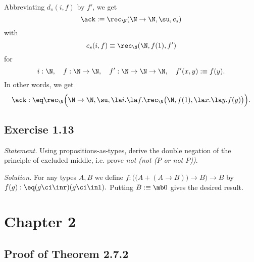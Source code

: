 \documentclass[12pt]{article}
\begin{document}
Abbreviating $d_s(i,f)$ by $f'$, we get 
$$
\ack:\equiv\rec_\N(\N\to\N,\su,c_s)
$$ 
with 
$$ 
c_s(i,f)\equiv\rec_\N(\N,f(1),f')
$$ 
for 
$$ 
i:\N,\quad f:\N\to\N,\quad f':\N\to\N\to\N,\quad f'(x,y):\equiv f(y).
$$ 
In other words, we get 
$$
\ack:\eq\rec_\N\Big(\N\to\N,\su,\la i.\la f.\rec_\N\big(\N,f(1),\la x.\la y.f(y)\big)\Big).
$$


\subsection{Exercise 1.13}

\emph{Statement.} Using propositions-as-types, derive the double negation of the principle of excluded middle, i.e. prove \emph{not (not ($P$ or not $P$))}.

\nn\emph{Solution.} For any types $A,B$ we define $f:\Big(\big(A+(A\to B)\big)\to B\Big)\to B$ by $f(g):\eq(g\ci\inr)(g\ci\inl).$ Putting $B:\equiv\mb0$ gives the desired result.

\begin{comment}

Here is a slightly stronger statement: For any types $A,B,C$ the types

(a) $\big((A+B)\to C\big)\to\big((A\to C)\times(B\to C)\big)$,

(b) $\big((A\to C)\times(B\to C)\big)\to\big((A+B)\to C\big)$,

(c) $(A\to B)\to A\to B$,

(d) $\Big(\big(A+(A\to B)\big)\to B\Big)\to\Big((A\to B)\times\big((A\to B)\to B\big)\Big)$, 

(e) $\Big((A\to B)\times\big((A\to B)\to B\big)\Big)\to B$,

(f) $\Big(\big(A+(A\to B)\big)\to B\Big)\to B$

\nn are inhabited. The proof that (a), (b), (c) are inhabited is left to the reader. The fact that (a) and (c) are inhabited implies that (d) and (e), and thus (f), are inhabited. Putting $B:\equiv\mb0$ in (f) gives the desired result.

\end{comment}


\section{Chapter 2}

\subsection{Proof of Theorem 2.7.2}
\end{document}
